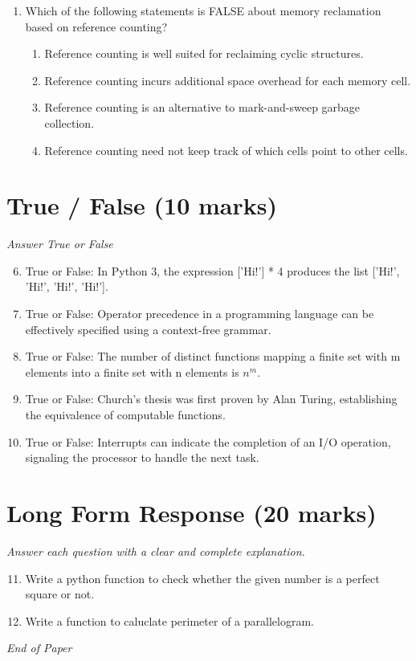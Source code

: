 \documentclass[12pt]{article}
\begin{document}
\begin{enumerate}[label=\arabic*.]
\begin{enumerate}[label=(\alph*)]
    \item xxxxy
\end{enumerate}
\item Which of the following statements is FALSE about memory reclamation based on reference counting?
\begin{enumerate}[label=(\alph*)]
    \item Reference counting is well suited for reclaiming cyclic structures.
    \item Reference counting incurs additional space overhead for each memory cell.
    \item Reference counting is an alternative to mark-and-sweep garbage collection.
    \item Reference counting need not keep track of which cells point to other cells.
\end{enumerate}
\end{enumerate}

\section*{True / False (10 marks)}
\textit{Answer True or False}
\begin{enumerate}[label=\arabic*.]
\setcounter{enumi}{5}
\item True or False: In Python 3, the expression ['Hi!'] * 4 produces the list ['Hi!', 'Hi!', 'Hi!', 'Hi!'].
\item True or False: Operator precedence in a programming language can be effectively specified using a context-free grammar.
\item True or False: The number of distinct functions mapping a finite set with m elements into a finite set with n elements is $n^m$.
\item True or False: Church's thesis was first proven by Alan Turing, establishing the equivalence of computable functions.
\item True or False: Interrupts can indicate the completion of an I/O operation, signaling the processor to handle the next task.
\end{enumerate}

\section*{Long Form Response (20 marks)}
\textit{Answer each question with a clear and complete explanation.}
\begin{enumerate}[label=\arabic*.]
\setcounter{enumi}{10}
\item Write a python function to check whether the given number is a perfect square or not.
\item Write a function to caluclate perimeter of a parallelogram.
\end{enumerate}

\vfill
\noindent\textit{End of Paper}
\end{document}
